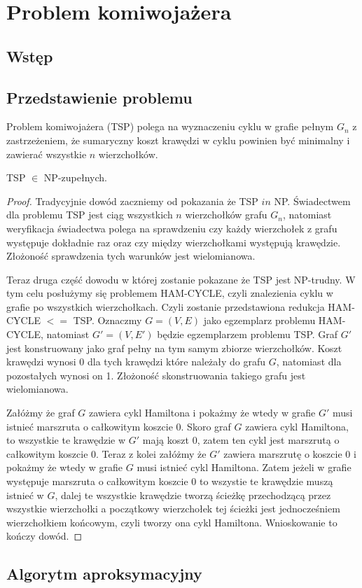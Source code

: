 \chapter{Problem komiwojażera}

\section{Wstęp}

\section{Przedstawienie problemu}

Problem komiwojażera (TSP) polega na wyznaczeniu cyklu w grafie pełnym $G_{n}$ z zastrzeżeniem, że sumaryczny koszt krawędzi w cyklu powinien być minimalny i zawierać wszystkie $n$ wierzchołków.  

\begin{twr}
TSP $\in$ NP-zupełnych.
\end{twr}


\begin{proof}

Tradycyjnie dowód zaczniemy od pokazania że TSP $in$ NP. Świadectwem dla problemu TSP jest ciąg wszystkich $n$ wierzchołków grafu $G_{n}$, natomiast weryfikacja świadectwa polega na sprawdzeniu czy każdy wierzchołek z grafu występuje dokładnie raz oraz czy między wierzchołkami występują krawędzie. Złożoność sprawdzenia tych warunków jest wielomianowa.

Teraz druga część dowodu w której zostanie pokazane że TSP jest NP-trudny. W tym celu posłużymy się problemem HAM-CYCLE, czyli znalezienia cyklu w grafie po wszystkich wierzchołkach. Czyli zostanie przedstawiona redukcja HAM-CYCLE $<=$ TSP. Oznaczmy $G=(V,E)$ jako egzemplarz problemu  HAM-CYCLE, natomiast $G'=(V,E')$ będzie egzemplarzem problemu TSP. Graf $G'$ jest konstruowany jako graf pełny na tym samym zbiorze wierzchołków. Koszt krawędzi wynosi 0 dla tych krawędzi które należały do grafu $G$, natomiast dla pozostałych wynosi on 1. Złożoność skonstruowania takiego grafu jest wielomianowa.

Załóżmy że graf $G$ zawiera cykl Hamiltona i pokażmy że wtedy w grafie $G'$ musi istnieć marszruta o całkowitym koszcie 0. Skoro graf $G$ zawiera cykl Hamiltona, to wszystkie te krawędzie w $G'$ mają koszt 0, zatem ten cykl jest marszrutą o całkowitym koszcie 0.
Teraz z kolei załóżmy że $G'$ zawiera marszrutę o koszcie 0 i pokażmy że wtedy w grafie $G$ musi istnieć cykl Hamiltona. Zatem jeżeli w grafie występuje marszruta o całkowitym koszcie 0 to wszystie te krawędzie muszą istnieć w $G$, dalej te wszystkie krawędzie tworzą ścieżkę przechodzącą przez wszystkie wierzchołki a początkowy wierzchołek tej ścieżki jest jednocześniem wierzchołkiem końcowym, czyli tworzy ona cykl Hamiltona. Wnioskowanie to kończy dowód.

\end{proof}


\section{Algorytm aproksymacyjny}